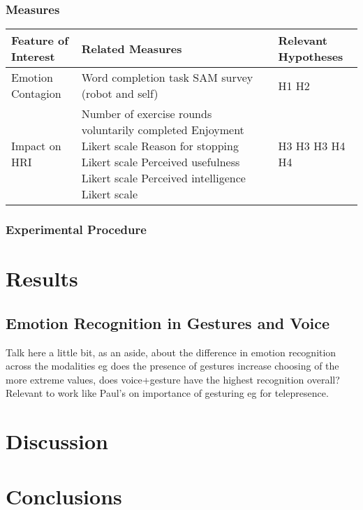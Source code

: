 \documentclass[11pt,a4paper]{report}
\begin{document}
\subsection{Measures}
\begin{tabular}{|l|p{7cm}|p{3.8cm}|}
\hline Feature of Interest & Related Measures & Relevant Hypotheses \\ 
\hline Emotion Contagion & Word completion task \newline SAM survey (robot and self) & H1 \newline H2 \\ 
\hline Impact on HRI & Number of exercise rounds voluntarily completed \newline Enjoyment Likert scale \newline Reason for stopping Likert scale \newline Perceived usefulness Likert scale \newline Perceived intelligence Likert scale &  H3 \newline \newline H3 \newline H3 \newline H4 \newline H4 \\
\hline 
\end{tabular} 
\subsection{Experimental Procedure}

\chapter{Results}

\section{Emotion Recognition in Gestures and Voice}
Talk here a little bit, as an aside, about the difference in emotion recognition across the modalities eg does the presence of gestures increase choosing of the more extreme values, does voice+gesture have the highest recognition overall? Relevant to work like Paul's on importance of gesturing eg for telepresence.

\chapter{Discussion}

\chapter{Conclusions}



\end{document}
